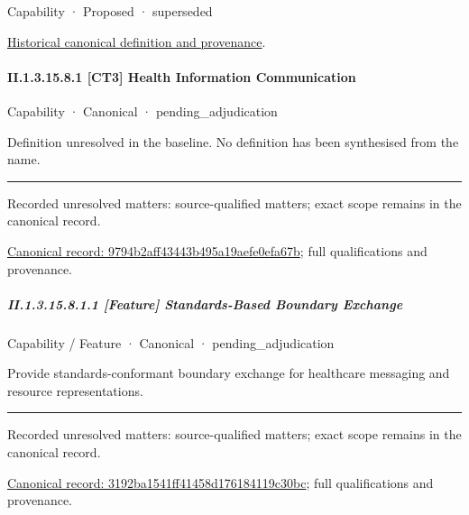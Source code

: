 \label{element:6a1030483dfc4ae6af6998b587129d1c}
{\small Capability · Proposed · superseded}\par
\href{../../../../continuum/strategy/capability/6a1030483dfc4ae6af6998b587129d1c.md}{Historical canonical definition and provenance}.\par
\paragraph*{II.1.3.15.8.1 [CT3] Health Information Communication}
\label{navigation:II.1.3.15.8.1}

\label{element:9794b2aff43443b495a19aefe0efa67b}
{\small Capability · Canonical · pending\_adjudication}\par

Definition unresolved in the baseline. No definition has been synthesised from the name.



\medskip\hrule\medskip

{\small Recorded unresolved matters: source-qualified matters; exact scope remains in the canonical record.}\par
{\footnotesize \href{../../../../continuum/strategy/capability/9794b2aff43443b495a19aefe0efa67b.md}{Canonical record: 9794b2aff43443b495a19aefe0efa67b}; full qualifications and provenance.}\par
\subparagraph*{II.1.3.15.8.1.1 [Feature] Standards-Based Boundary Exchange}
\label{navigation:II.1.3.15.8.1.1}

\label{element:3192ba1541ff41458d176184119c30bc}
{\small Capability / Feature · Canonical · pending\_adjudication}\par

Provide standards-conformant boundary exchange for healthcare messaging and resource representations.



\medskip\hrule\medskip

{\small Recorded unresolved matters: source-qualified matters; exact scope remains in the canonical record.}\par
{\footnotesize \href{../../../../continuum/strategy/capability/feature/3192ba1541ff41458d176184119c30bc.md}{Canonical record: 3192ba1541ff41458d176184119c30bc}; full qualifications and provenance.}\par
